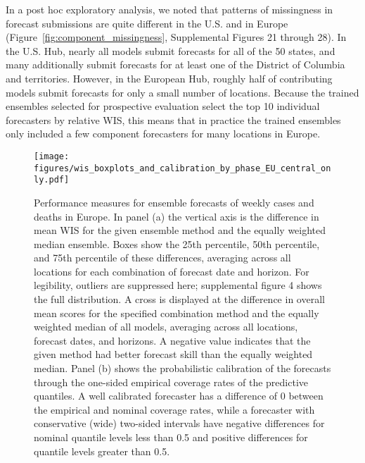 \documentclass[11pt,3p,review,authoryear]{elsarticle}
\begin{document}
In a post hoc exploratory analysis, we noted that patterns of missingness in forecast submissions are quite different in the U.S. and in Europe (Figure~\ref{fig:component_missingness}, Supplemental Figures 21 through 28). In the U.S. Hub, nearly all models submit forecasts for all of the 50 states, and many additionally submit forecasts for at least one of the District of Columbia and territories. However, in the European Hub, roughly half of contributing models submit forecasts for only a small number of locations. Because the trained ensembles selected for prospective evaluation select the top 10 individual forecasters by relative WIS, this means that in practice the trained ensembles only included a few component forecasters for many locations in Europe.

\begin{figure}
\texttt{[image: figures/wis\_boxplots\_and\_calibration\_by\_phase\_EU\_central\_only.pdf]}
\caption{Performance measures for ensemble forecasts of weekly cases and deaths in Europe. In panel (a) the vertical axis is the difference in mean WIS for the given ensemble method and the equally weighted median ensemble.
Boxes show the 25th percentile, 50th percentile, and 75th percentile of these differences, averaging across all locations for each combination of forecast date and horizon.
For legibility, outliers are suppressed here; supplemental figure 4 shows the full distribution.
A cross is displayed at the difference in overall mean scores for the specified combination method and the equally weighted median of all models, averaging across all locations, forecast dates, and horizons.
A negative value indicates that the given method had better forecast skill than the equally weighted median.
Panel (b) shows the probabilistic calibration of the forecasts through the one-sided empirical coverage rates of the predictive quantiles.
A well calibrated forecaster has a difference of 0 between the empirical and nominal coverage rates, while a forecaster with conservative (wide) two-sided intervals have negative differences for nominal quantile levels less than 0.5 and positive differences for quantile levels greater than 0.5.
}
\label{fig:wis_boxplots_and_calibration_by_phase_EU_central_only}
\end{figure}
\end{document}
